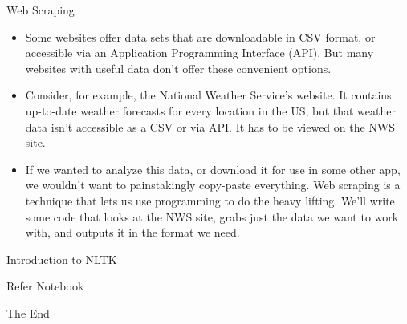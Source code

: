 \documentclass{beamer}
\begin{document}
\begin{frame}{Web Scraping}
\begin{flushleft}
	\begin{itemize}
		\item Some websites offer data sets that are downloadable in CSV format, or accessible via an Application Programming Interface (API). But many websites with useful data don't offer these convenient options.
		\item Consider, for example, the National Weather Service's website. It contains up-to-date weather forecasts for every location in the US, but that weather data isn't accessible as a CSV or via API. It has to be viewed on the NWS site.
		\item If we wanted to analyze this data, or download it for use in some other app, we wouldn't want to painstakingly copy-paste everything. Web scraping is a technique that lets us use programming to do the heavy lifting. We'll write some code that looks at the NWS site, grabs just the data we want to work with, and outputs it in the format we need.
	\end{itemize}
\end{flushleft}
\end{frame}

\begin{frame}{Introduction to NLTK}
	\begin{flushleft}
		\huge{\centerline{Refer Notebook}}
	\end{flushleft}
\end{frame}

\begin{frame}
\huge{\centerline{The End}}
\end{frame}
\end{document}
